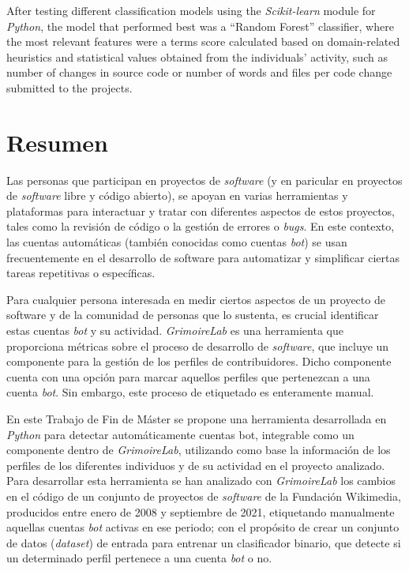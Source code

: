 \documentclass[a4paper, 12pt]{book}
\begin{document}
After testing different classification models using the \emph{Scikit-learn} module for \emph{Python}, the model that performed best was a ``Random Forest'' classifier, where the most relevant features were a terms score calculated based on domain-related heuristics and statistical values obtained from the individuals' activity, such as number of changes in source code or number of words and files per code change submitted to the projects.


\chapter*{Resumen}

Las personas que participan en proyectos de \emph{software} (y en paricular en proyectos de \emph{software} libre y código abierto), se apoyan en varias herramientas y plataformas para interactuar y tratar con diferentes aspectos de estos proyectos, tales como la revisión de código o la gestión de errores o \emph{bugs}. En este contexto, las cuentas automáticas (también conocidas como cuentas \emph{bot}) se usan frecuentemente en el desarrollo de software para automatizar y simplificar ciertas tareas repetitivas o específicas.

Para cualquier persona interesada en medir ciertos aspectos de un proyecto de software y de la comunidad de personas que lo sustenta, es crucial identificar estas cuentas \emph{bot} y su actividad. \emph{GrimoireLab} es una herramienta que proporciona métricas sobre el proceso de desarrollo de \emph{software}, que incluye un componente para la gestión de los perfiles de contribuidores. Dicho componente cuenta con una opción para marcar aquellos perfiles que pertenezcan a una cuenta \emph{bot}. Sin embargo, este proceso de etiquetado es enteramente manual.

En este Trabajo de Fin de Máster se propone una herramienta desarrollada en \emph{Python} para detectar automáticamente cuentas bot, integrable como un componente dentro de \emph{GrimoireLab}, utilizando como base la información de los perfiles de los diferentes individuos y de su actividad en el proyecto analizado. Para desarrollar esta herramienta se han analizado con \emph{GrimoireLab} los cambios en el código de un conjunto de proyectos de \emph{software} de la Fundación Wikimedia, producidos entre enero de 2008 y septiembre de 2021, etiquetando manualmente aquellas cuentas \emph{bot} activas en ese periodo; con el propósito de crear un conjunto de datos (\emph{dataset}) de entrada para entrenar un clasificador binario, que detecte si un determinado perfil pertenece a una cuenta \emph{bot} o no.
\end{document}
